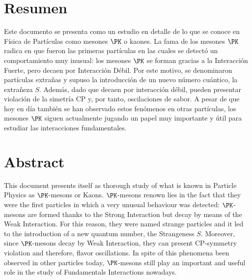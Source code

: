 \chapter*{Resumen}
\label{cap:abstract}

Este documento se presenta como un estudio en detalle de lo que se conoce en Física de Partículas como mesones $\PK$ o kaones. La fama de los mesones $\PK$ radica en que fueron las primeras partículas en las cuales se detectó un comportamiento muy inusual: los mesones $\PK$ se forman gracias a la Interacción Fuerte, pero decaen por Interacción Débil. Por este motivo, se denominaron partículas extrañas y supuso la introducción de un nuevo número cuántico, la extrañeza $S$. Además, dado que decaen por interacción débil, pueden presentar violación de la simetría CP y, por tanto, oscilaciones de sabor. A pesar de que hoy en día también se han observado estos fenómenos en otras partículas, los mesones $\PK$ siguen actualmente jugando un papel muy importante y útil para estudiar las interacciones fundamentales. 
\vspace{2cm}

{\let\clearpage\relax\chapter*{Abstract}}
This document presents itself as thorough study of what is known in Particle Physics as $\PK$-mesons or Kaons. $\PK$-mesons renown lies in the fact that they were the first particles in which a very unusual behaviour was detected: $\PK$-mesons are formed thanks to the Strong Interaction but decay by means of the Weak Interaction. For this reason, they were named strange particles and it led to the introduction of a new quantum number, the Strangeness $S$. Moreover, since $\PK$-mesons decay by Weak Interaction, they can present CP-symmetry violation and therefore, flavor oscillations. In spite of this phenomena been observed  in other particles today, $\PK$-mesons still play an important and useful role in the study of Fundamentals Interactions nowadays.